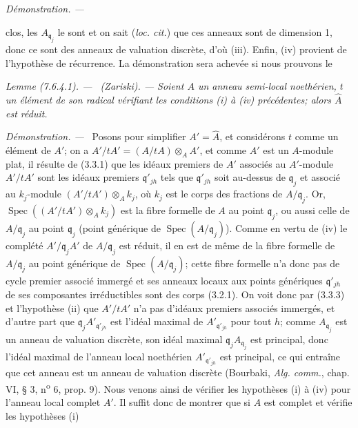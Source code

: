 \documentclass[10pt,oneside]{book}
\newcommand{\oldpage}[2][]{%
  \setcounter{footnote}{0}%
  \marginpar{\scriptsize\textbf{#1}~|~#2}\ignorespaces}
\newenvironment{lemma}[1][]{%
  \par\medskip\noindent\itshape Lemme (#1). ---\ }{\par}
\newenvironment{proof}{%
  \par\medskip\noindent\textit{Démonstration. ---\ }}{\par}
\begin{document}
\begin{proof}
\oldpage[IV-2]{211}

clos, les $A_{\mathfrak q_j}$ le sont et on sait (\emph{loc. cit.}) que ces
anneaux sont de dimension 1, donc ce sont des anneaux de valuation discrète,
d'où (iii). Enfin, (iv) provient de l'hypothèse de récurrence. La démonstration
sera achevée si nous prouvons le

\begin{lemma}[7.6.4.1]
\label{IV.2.s7.6.4.1-fr}
(Zariski). --- Soient $A$ un anneau semi-local noethérien, $t$ un élément de
son radical vérifiant les conditions (i) à (iv) précédentes; alors
$\widehat A$ est réduit.
\end{lemma}

\begin{proof}
Posons pour simplifier $A'=\widehat A$, et considérons $t$ comme un élément de
$A'$; on a $A'/tA'=(A/tA)\otimes_AA'$, et comme $A'$ est un $A$-module plat,
il résulte de (3.3.1) que les idéaux premiers de $A'$ associés au $A'$-module
$A'/tA'$ sont les idéaux premiers $\mathfrak q'_{jh}$ tels que
$\mathfrak q'_{jh}$ soit au-dessus de $\mathfrak q_j$ et associé au
$k_j$-module $(A'/tA')\otimes_Ak_j$, où $k_j$ est le corps des fractions de
$A/\mathfrak q_j$. Or,
$\operatorname{Spec}((A'/tA')\otimes_Ak_j)$ est la fibre formelle de $A$ au
point $\mathfrak q_j$, ou aussi celle de $A/\mathfrak q_j$ au point
$\mathfrak q_j$ (point générique de
$\operatorname{Spec}(A/\mathfrak q_j)$). Comme en vertu de (iv) le complété
$A'/\mathfrak q_jA'$ de $A/\mathfrak q_j$ est réduit, il en est de même de la
fibre formelle de $A/\mathfrak q_j$ au point générique de
$\operatorname{Spec}(A/\mathfrak q_j)$; cette fibre formelle n'a donc pas de
cycle premier associé immergé et ses anneaux locaux aux points génériques
$\mathfrak q'_{jh}$ de ses composantes irréductibles sont des corps (3.2.1).
On voit donc par (3.3.3) et l'hypothèse (ii) que $A'/tA'$ n'a pas d'idéaux
premiers associés immergés, et d'autre part que
$\mathfrak q_jA'_{\mathfrak q'_{jh}}$ est l'idéal maximal de
$A'_{\mathfrak q'_{jh}}$ pour tout $h$; comme $A_{\mathfrak q_j}$ est un
anneau de valuation discrète, son idéal maximal
$\mathfrak q_jA_{\mathfrak q_j}$ est principal, donc l'idéal maximal de
l'anneau local noethérien $A'_{\mathfrak q'_{jh}}$ est principal, ce qui
entraîne que cet anneau est un anneau de valuation discrète (Bourbaki,
\emph{Alg. comm.}, chap. VI, § 3, n\textsuperscript{o} 6, prop. 9). Nous venons
ainsi de vérifier les hypothèses (i) à (iv) pour l'anneau local complet $A'$.
Il suffit donc de montrer que si $A$ est complet et vérifie les hypothèses (i)

\end{proof}
\end{proof}
\end{document}
